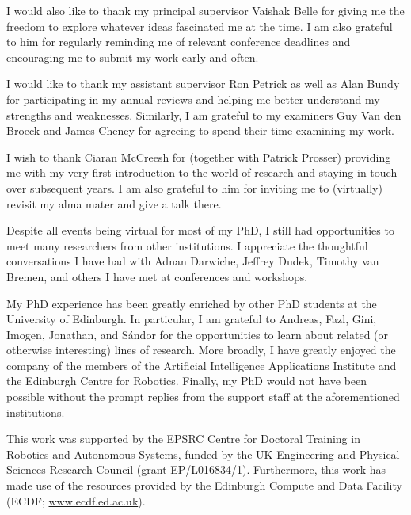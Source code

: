 \documentclass[phd,aiai,twoside,fullspacing,logo]{infthesis}
\theoremstyle{definition}
\theoremstyle{remark}
\numberwithin{claim}{chapter}
\numberwithin{assumption}{chapter}
\numberwithin{conjecture}{chapter}
\numberwithin{constraint}{chapter}
\numberwithin{fact}{chapter}
\numberwithin{proposition}{chapter}
\numberwithin{theorem}{chapter}
\numberwithin{lemma}{chapter}
\numberwithin{definition}{chapter}
\numberwithin{example}{chapter}
\numberwithin{experiment}{chapter}
\begin{document}
\begin{preliminary}
\begin{acknowledgements}
  I would also like to thank my principal supervisor Vaishak Belle for giving me
  the freedom to explore whatever ideas fascinated me at the time. I am also
  grateful to him for regularly reminding me of relevant conference deadlines
  and encouraging me to submit my work early and often.

  I would like to thank my assistant supervisor Ron Petrick as well as Alan
  Bundy for participating in my annual reviews and helping me better understand
  my strengths and weaknesses. Similarly, I am grateful to my examiners Guy Van
  den Broeck and James Cheney for agreeing to spend their time examining my
  work.

  I wish to thank Ciaran McCreesh for (together with Patrick Prosser) providing
  me with my very first introduction to the world of research and staying in
  touch over subsequent years. I am also grateful to him for inviting me to
  (virtually) revisit my alma mater and give a talk there.

  Despite all events being virtual for most of my PhD, I still had opportunities
  to meet many researchers from other institutions. I appreciate the thoughtful
  conversations I have had with Adnan Darwiche, Jeffrey Dudek, Timothy van
  Bremen, and others I have met at conferences and workshops.

  My PhD experience has been greatly enriched by other PhD students at the
  University of Edinburgh. In particular, I am grateful to Andreas, Fazl, Gini,
  Imogen, Jonathan, and S\'{a}ndor for the opportunities to learn about related
  (or otherwise interesting) lines of research. More broadly, I have greatly
  enjoyed the company of the members of the Artificial Intelligence Applications
  Institute and the Edinburgh Centre for Robotics. Finally, my PhD would not
  have been possible without the prompt replies from the support staff at the
  aforementioned institutions.

  This work was supported by the EPSRC Centre for Doctoral Training in Robotics
  and Autonomous Systems, funded by the UK Engineering and Physical Sciences
  Research Council (grant EP/L016834/1). Furthermore, this work has made use of
  the resources provided by the Edinburgh Compute and Data Facility (ECDF\@;
  \url{www.ecdf.ed.ac.uk}).
\end{acknowledgements}

\standarddeclaration


\tableofcontents


\end{preliminary}
\end{document}
